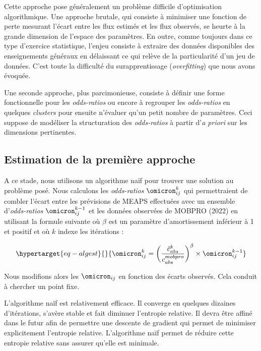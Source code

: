 \documentclass[
  10pt,
  a4paper,
  numbers=noendperiod,
  DIV=9]{scrartcl}
\begin{document}
Cette approche pose généralement un problème difficile d'optimisation
algorithmique. Une approche brutale, qui consiste à minimiser une
fonction de perte mesurant l'écart entre les flux estimés et les flux
observés, se heurte à la grande dimension de l'espace des paramètres. En
outre, comme toujours dans ce type d'exercice statistique, l'enjeu
consiste à extraire des données disponibles des enseignements généraux
en délaissant ce qui relève de la particularité d'un jeu de données.
C'est toute la difficulté du surapprentissage (\emph{overfitting}) que
nous avons évoquée.

Une seconde approche, plus parcimonieuse, consiste à définir une forme
fonctionnelle pour les \emph{odds-ratios} ou encore à regrouper les
\emph{odds-ratios} en quelques \emph{clusters} pour ensuite n'évaluer
qu'un petit nombre de paramètres. Ceci suppose de modéliser la
structuration des \emph{odds-ratios} à partir d'\emph{a priori} sur les
dimensions pertinentes.

\hypertarget{estimation-de-la-premiuxe8re-approche}{%
\subsection{Estimation de la première
approche}\label{estimation-de-la-premiuxe8re-approche}}

A ce stade, nous utilisons un algorithme naïf pour trouver une solution
au problème posé. Nous calculons les \emph{odds-ratios}
\(\omicron^k_{ij}\) qui permettraient de combler l'écart entre les
prévisions de MEAPS effectuées avec un ensemble d'\emph{odds-ratios}
\(\omicron^{k-1}_{ij}\) et les données observées de MOBPRO (2022) en
utilisant la formule suivante où \(\beta\) est un paramètre
d'amortissement inférieur à 1 et positif et où \(k\) indexe les
itérations :

\begin{equation}\protect\hypertarget{eq-algest}{}{
\omicron^k_{ij} = \biggl(\frac{\tilde{c}^k_{abs}}{
c^{mobpro}_{abs}}\biggr)^\beta \times \omicron^{k-1}_{ij}
}\label{eq-algest}\end{equation}

Nous modifions alors les \(\omicron_{ij}\) en fonction des écarts
observés. Cela conduit à chercher un point fixe.

L'algorithme naïf est relativement efficace. Il converge en quelques
dizaines d'itérations, s'avère stable et fait diminuer l'entropie
relative. Il devra être affiné dans le futur afin de permettre une
descente de gradient qui permet de minimiser explicitement l'entropie
relative. L'algorithme naïf permet de réduire cette entropie relative
sans assurer qu'elle est minimale.
\end{document}
